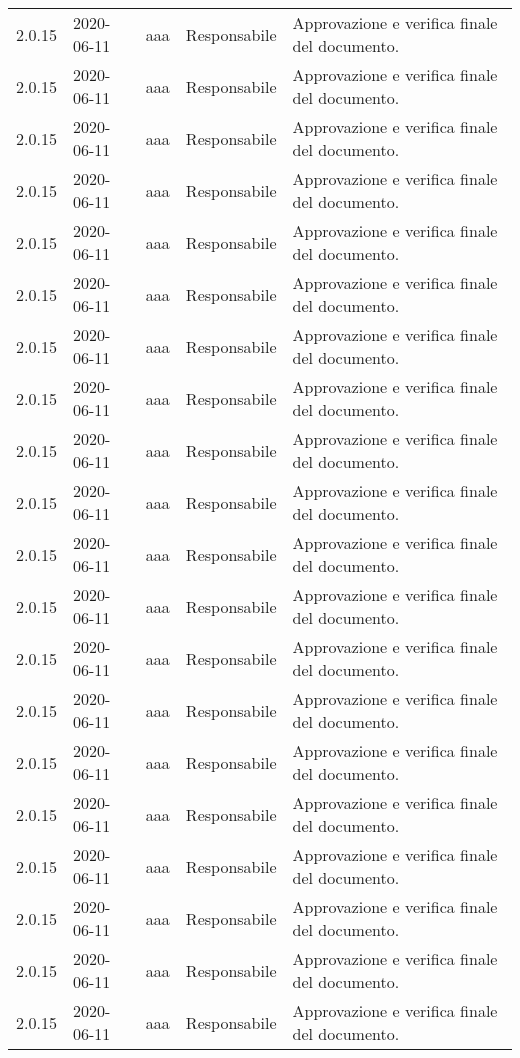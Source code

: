 {\begin{longtable}{c C{3.5cm} c C{3.5cm} C{3.5cm}}
2.0.15 & 2020-06-11 & aaa & Responsabile & Approvazione e verifica finale del documento. \\
2.0.15 & 2020-06-11 & aaa & Responsabile & Approvazione e verifica finale del documento. \\
2.0.15 & 2020-06-11 & aaa & Responsabile & Approvazione e verifica finale del documento. \\
2.0.15 & 2020-06-11 & aaa & Responsabile & Approvazione e verifica finale del documento. \\
2.0.15 & 2020-06-11 & aaa & Responsabile & Approvazione e verifica finale del documento. \\
2.0.15 & 2020-06-11 & aaa & Responsabile & Approvazione e verifica finale del documento. \\
2.0.15 & 2020-06-11 & aaa & Responsabile & Approvazione e verifica finale del documento. \\
2.0.15 & 2020-06-11 & aaa & Responsabile & Approvazione e verifica finale del documento. \\
2.0.15 & 2020-06-11 & aaa & Responsabile & Approvazione e verifica finale del documento. \\
2.0.15 & 2020-06-11 & aaa & Responsabile & Approvazione e verifica finale del documento. \\
2.0.15 & 2020-06-11 & aaa & Responsabile & Approvazione e verifica finale del documento. \\
2.0.15 & 2020-06-11 & aaa & Responsabile & Approvazione e verifica finale del documento. \\
2.0.15 & 2020-06-11 & aaa & Responsabile & Approvazione e verifica finale del documento. \\
2.0.15 & 2020-06-11 & aaa & Responsabile & Approvazione e verifica finale del documento. \\
2.0.15 & 2020-06-11 & aaa & Responsabile & Approvazione e verifica finale del documento. \\
2.0.15 & 2020-06-11 & aaa & Responsabile & Approvazione e verifica finale del documento. \\
2.0.15 & 2020-06-11 & aaa & Responsabile & Approvazione e verifica finale del documento. \\
2.0.15 & 2020-06-11 & aaa & Responsabile & Approvazione e verifica finale del documento. \\
2.0.15 & 2020-06-11 & aaa & Responsabile & Approvazione e verifica finale del documento. \\
2.0.15 & 2020-06-11 & aaa & Responsabile & Approvazione e verifica finale del documento. \\

\end{longtable}}
